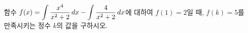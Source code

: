 함수 $f(x)=\displaystyle\int \dfrac{x^4}{x^2+2}\mkern3mu dx-\int \dfrac{4}{x^2+2}\mkern3mu dx$에 대하여 $f(1)=2$일 때, $f(k)=5$를 만족시키는 정수 $k$의 값을 구하시오.
